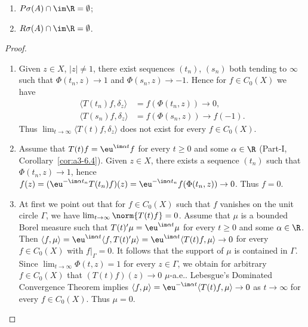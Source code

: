\begin{example}
\begin{enumerate}[\upshape (i), wide, labelindent=.25em]
\begin{enumerate}[\upshape (i)]
	\item 
	$P\sigma(A)\cap\im\R = \emptyset$;
	
	\item 
	$R\sigma(A)\cap\im\R = \emptyset$.
\end{enumerate}
\begin{proof}
\begin{enumerate}[\upshape (i), wide, labelindent=.25em]

\item
Given $z \in X$, $|z| \neq 1$, there exist sequences $(t_n)$, $(s_n)$ both tending to $\infty$ such that $\Phi(t_n,z) \to 1$ and $\Phi(s_n,z) \to -1$. 
Hence for $f \in C_{0}(X)$ we have
\[
   \begin{aligned}
   \langle T(t_n)f,\delta_z \rangle &= f(\Phi(t_n,z)) \to 0 ,\\
   \langle T(s_n)f,\delta_z \rangle &= f(\Phi(s_n,z)) \to f(-1) .
   \end{aligned}
\]
Thus $\lim_{t\to\infty} \langle T(t)f,\delta_z \rangle$ does not exist for every $f \in C_{0}(X)$.


\item
Assume that $T(t)f = \eu^{\im\alpha t}f$ for every $t \geq 0$ and some $\alpha \in \R$ (\cf Part-I, Corollary~\ref{cor:a3-6.4}). 
Given $z \in X$, there exists a sequence $(t_n)$ such that $\Phi(t_n,z) \to 1$, hence
$f(z) = (\eu^{-\im\alpha t_n}T(t_n)f)(z) = \eu^{-\im\alpha t_n}f(\Phi(t_n,z)) \to 0$. Thus $f = 0$.


\item
At first we point out that for $f \in C_{0}(X)$ such that $f$ vanishes on the unit circle $\Gamma$, we have $\lim_{t\to\infty} \norm{T(t)f} = 0$.
Assume that $\mu$ is a bounded Borel measure such that $T(t)'\mu = \eu^{\im\alpha t}\mu$ for every $t \geq 0$ and some $\alpha \in \R$. 
Then $\langle f,\mu \rangle = \eu^{\im\alpha t}\langle f,T(t)'\mu \rangle = \eu^{\im\alpha t}\langle T(t)f,\mu \rangle \to 0$ for every $f \in C_{0}(X)$ with $f|_\Gamma = 0$. 
It follows that the support of\/ $\mu$ is contained in $\Gamma$. Since $\lim_{t\to\infty} \Phi(t,z) = 1$ for every $z \in \Gamma$, we obtain for arbitrary $f \in C_{0}(X)$ that $(T(t)f)(z) \to 0$ $\mu$-a.e.. 
Lebesgue's Dominated Convergence Theorem implies $\langle f,\mu \rangle = \eu^{-\im\alpha t}\langle T(t)f,\mu \rangle \to 0$ as $t \to \infty$ for every $f \in C_{0}(X)$. Thus $\mu = 0$.
\end{enumerate}
\end{proof}
\end{enumerate}
\end{example}

